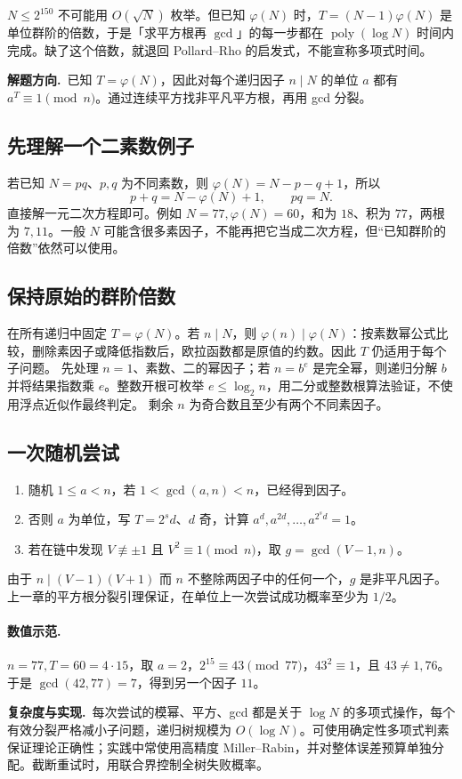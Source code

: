 \documentclass[UTF8,a4paper,11pt,oneside,openany,fontset=fandol]{ctexbook}
\theoremstyle{definition}
\newcommand{\hint}{\par\noindent\textbf{解题方向.}\ }
\newcommand{\cost}{\par\noindent\textbf{复杂度与实现.}\ }
\begin{document}
\begin{tip}
$N\le2^{150}$ 不可能用 $O(\sqrt N)$ 枚举。但已知 $\varphi(N)$ 时，$T=(N-1)\varphi(N)$ 是单位群阶的倍数，于是「求平方根再 $\gcd$」的每一步都在 $\operatorname{poly}(\log N)$ 时间内完成。缺了这个倍数，就退回 Pollard--Rho 的启发式，不能宣称多项式时间。
\end{tip}

\hint 已知 $T=\varphi(N)$，因此对每个递归因子 $n\mid N$ 的单位 $a$ 都有 $a^T\equiv1\pmod n$。通过连续平方找非平凡平方根，再用 gcd 分裂。


\subsection{先理解一个二素数例子}
若已知 $N=pq$、$p,q$ 为不同素数，则 $\varphi(N)=N-p-q+1$，所以
\[
 p+q=N-\varphi(N)+1,\qquad pq=N.
\]
直接解一元二次方程即可。例如 $N=77,\varphi(N)=60$，和为 $18$、积为 $77$，两根为 $7,11$。一般 $N$ 可能含很多素因子，不能再把它当成二次方程，但“已知群阶的倍数”依然可以使用。

\subsection{保持原始的群阶倍数}
在所有递归中固定 $T=\varphi(N)$。若 $n\mid N$，则 $\varphi(n)\mid\varphi(N)$：按素数幂公式比较，删除素因子或降低指数后，欧拉函数都是原值的约数。因此 $T$ 仍适用于每个子问题。
先处理 $n=1$、素数、二的幂因子；若 $n=b^e$ 是完全幂，则递归分解 $b$ 并将结果指数乘 $e$。整数开根可枚举 $e\le\log_2n$，用二分或整数根算法验证，不使用浮点近似作最终判定。
剩余 $n$ 为奇合数且至少有两个不同素因子。

\subsection{一次随机尝试}
\begin{enumerate}
\item 随机 $1\le a<n$，若 $1<\gcd(a,n)<n$，已经得到因子。
\item 否则 $a$ 为单位，写 $T=2^sd$、$d$ 奇，计算 $a^d,a^{2d},\ldots,a^{2^sd}=1$。
\item 若在链中发现 $V\not\equiv\pm1$ 且 $V^2\equiv1\pmod n$，取 $g=\gcd(V-1,n)$。
\end{enumerate}
由于 $n\mid(V-1)(V+1)$ 而 $n$ 不整除两因子中的任何一个，$g$ 是非平凡因子。上一章的平方根分裂引理保证，在单位上一次尝试成功概率至少为 $1/2$。

\paragraph{数值示范.} $n=77,T=60=4\cdot15$，取 $a=2$，$2^{15}\equiv43\pmod{77}$，$43^2\equiv1$，且 $43\ne1,76$。于是 $\gcd(42,77)=7$，得到另一个因子 $11$。
\cost 每次尝试的模幂、平方、gcd 都是关于 $\log N$ 的多项式操作，每个有效分裂严格减小子问题，递归树规模为 $O(\log N)$。可使用确定性多项式判素保证理论正确性；实践中常使用高精度 Miller--Rabin，并对整体误差预算单独分配。截断重试时，用联合界控制全树失败概率。
\end{document}
